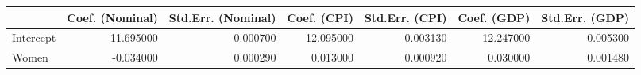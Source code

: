 \begin{tabular}{lrrrrrr}
\toprule
 & Coef. (Nominal) & Std.Err. (Nominal) & Coef. (CPI) & Std.Err. (CPI) & Coef. (GDP) & Std.Err. (GDP) \\
\midrule
Intercept & 11.695000 & 0.000700 & 12.095000 & 0.003130 & 12.247000 & 0.005300 \\
Women & -0.034000 & 0.000290 & 0.013000 & 0.000920 & 0.030000 & 0.001480 \\
\bottomrule
\end{tabular}

